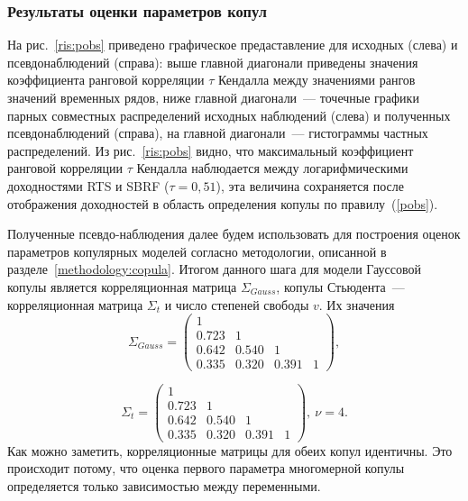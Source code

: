 \subsubsection{Результаты оценки параметров копул}


На рис.~\ref{ris:pobs} приведено графическое предаставление для исходных (слева) и псевдо\-наблюдений (справа): выше главной диагонали приведены значения коэффициента ранговой корреляции $\tau$ Кендалла между значениями рангов значений временных рядов, ниже главной диагонали~--- точечные графики парных совместных распределений исходных наблюдений (слева) и полученных псевдо\-наблюдений (справа), на главной диагонали~--- гистограммы частных распределений.
Из рис.~\ref{ris:pobs} видно, что максимальный коэффициент ранговой корреляции $\tau$ Кендалла наблюдается между логарифмическими доходностями RTS и SBRF ($\tau=0,51$), эта величина сохраняется после отображения доходностей в область определения копулы по правилу~(\ref{pobs}).

Полученные псевдо-наблюдения далее будем использовать для построения оценок параметров копулярных моделей согласно методологии, описанной в разделе~\ref{methodology:copula}.
Итогом данного шага для модели Гауссовой копулы является корреляционная матрица $ \Sigma_{Gauss}$, копулы Стьюдента~--- корреляционная матрица $ \Sigma_{t}$ и число степеней свободы $v$. Их значения
%
\begin{equation} \label{gausscopfit}
    \Sigma_{Gauss} = \left(
    \begin{array}{cccc}
        1 & & & \\
        0.723 & 1 & & \\
        0.642 & 0.540 & 1 & \\
        0.335 & 0.320 & 0.391 & 1
    \end{array} \right),
\end{equation}

\begin{equation} \label{tcopfit}
    \Sigma_t = \left(
    \begin{array}{cccc}
        1 & & & \\
        0.723 & 1 & & \\
        0.642 & 0.540 & 1 & \\
        0.335 & 0.320 & 0.391 & 1
    \end{array} \right), \ \nu = 4.
\end{equation}
%
Как можно заметить, корреляционные матрицы для обеих копул идентичны. %
Это происходит потому, что оценка первого параметра многомерной копулы определяется только зависимостью между переменными.

